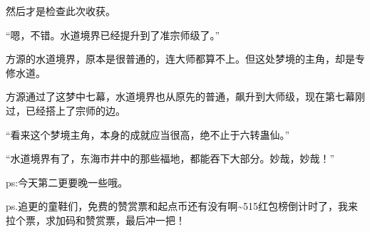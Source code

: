 \begin{this_body}
然后才是检查此次收获。

“嗯，不错。水道境界已经提升到了准宗师级了。”

方源的水道境界，原本是很普通的，连大师都算不上。但这处梦境的主角，却是专修水道。

方源通过了这梦中七幕，水道境界也从原先的普通，飙升到大师级，现在第七幕刚过，已经搭上了宗师的边。

“看来这个梦境主角，本身的成就应当很高，绝不止于六转蛊仙。”

“水道境界有了，东海市井中的那些福地，都能吞下大部分。妙哉，妙哉！”

ps:今天第二更要晚一些哦。

ps.追更的童鞋们，免费的赞赏票和起点币还有没有啊\~{}515红包榜倒计时了，我来拉个票，求加码和赞赏票，最后冲一把！

\end{this_body}

